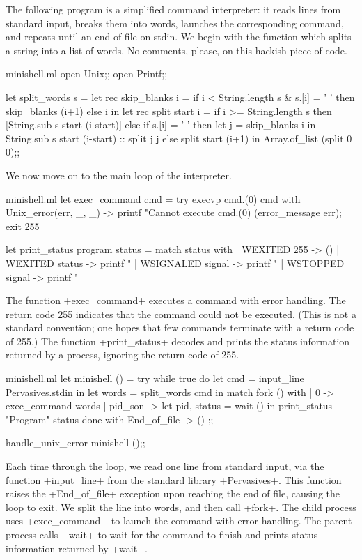 The following program is a simplified command interpreter: it reads
lines from standard input, breaks them into words, launches the
corresponding command, and repeats until an end of file on stdin.  We
begin with the function which splits a string into a list of words.
No comments, please, on this hackish piece of code.
\begin{listingcodefile}{minishell.ml}
open Unix;;
open Printf;;

let split_words s =
 let rec skip_blanks i =
   if i < String.length s & s.[i] = ' '
   then skip_blanks (i+1)
   else i in
 let rec split start i =
   if i >= String.length s then
     [String.sub s start (i-start)]
   else if s.[i] = ' ' then
     let j = skip_blanks i in
     String.sub s start (i-start) :: split j j
   else
     split start (i+1) in
 Array.of_list (split 0 0);;
\end{listingcodefile}
%
We now move on to the main loop of the interpreter.
%
\begin{listingcodefile}{minishell.ml}
let exec_command cmd =
 try execvp cmd.(0) cmd
 with Unix_error(err, _, _) ->
   printf "Cannot execute %
     cmd.(0) (error_message err);
   exit 255

let print_status program status =
 match status with
 | WEXITED 255 -> ()
 | WEXITED status ->
     printf "%
 | WSIGNALED signal ->
     printf "%
 | WSTOPPED signal ->
     printf "%
\end{listingcodefile}
%
The function \ml+exec_command+ executes a command with error handling.
The return code 255 indicates that the command could not be executed.
(This is not a standard convention; one hopes that few commands
terminate with a return code of 255.)  The function
\ml+print_status+ decodes and prints the status information returned
by a process, ignoring the return code of 255.
%
\begin{listingcodefile}{minishell.ml}
let minishell () =
 try
   while true do
     let cmd = input_line Pervasives.stdin in
     let words = split_words cmd in
     match fork () with
     | 0 -> exec_command words
     | pid_son ->
         let pid, status = wait () in
         print_status "Program" status
   done
 with End_of_file -> ()
;;

handle_unix_error minishell ();;
\end{listingcodefile}
%
Each time through the loop, we read one line from standard input, via
the function \ml+input_line+ from the standard library
\ml+Pervasives+. This function raises the \ml+End_of_file+ exception
upon reaching the end of file, causing the loop to exit. We split the
line into words, and then call \ml+fork+.  The child process uses
\ml+exec_command+ to launch the command with error handling.  The
parent process calls \ml+wait+ to wait for the command to finish and
prints status information returned by \ml+wait+.

